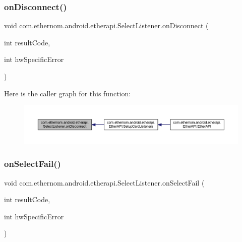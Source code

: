 \subsubsection{\texorpdfstring{on\+Disconnect()}{onDisconnect()}}
{\footnotesize\ttfamily void com.\+ethernom.\+android.\+etherapi.\+Select\+Listener.\+on\+Disconnect (\begin{DoxyParamCaption}\item[{int}]{result\+Code,  }\item[{int}]{hw\+Specific\+Error }\end{DoxyParamCaption})}

Here is the caller graph for this function\+:\nopagebreak
\begin{figure}[H]
\begin{center}
\leavevmode
\includegraphics[width=350pt]{interfacecom_1_1ethernom_1_1android_1_1etherapi_1_1_select_listener_a79bddd3d84d6e92505d5f22b1567e403_icgraph}
\end{center}
\end{figure}
\mbox{\label{interfacecom_1_1ethernom_1_1android_1_1etherapi_1_1_select_listener_a7ecaa3bf4d2d13db58fe1a027e2340e6}} 
\subsubsection{\texorpdfstring{on\+Select\+Fail()}{onSelectFail()}}
{\footnotesize\ttfamily void com.\+ethernom.\+android.\+etherapi.\+Select\+Listener.\+on\+Select\+Fail (\begin{DoxyParamCaption}\item[{int}]{result\+Code,  }\item[{int}]{hw\+Specific\+Error }\end{DoxyParamCaption})}

